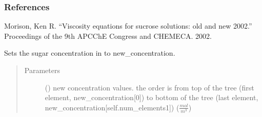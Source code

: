 \documentclass[letterpaper,10pt,english]{sphinxmanual}
\begin{document}
\begin{fulllineitems}
\begin{fulllineitems}
\begin{description}
\end{description}
\subsubsection*{References}

Morison, Ken R. “Viscosity equations for sucrose solutions: old and new 2002.”
Proceedings of the 9th APCChE Congress and CHEMECA. 2002.

\end{fulllineitems}


\begin{fulllineitems}
\label{\detokenize{index:src.tree.Tree.update_sugar_concentration}}
Sets the sugar concentration in  to new\_concentration.
\begin{quote}\begin{description}
\item[{Parameters}] \leavevmode
{} (\sphinxstyleliteralemphasis{\sphinxupquote{(}}\sphinxstyleliteralemphasis{\sphinxupquote{, }}\sphinxstyleliteralemphasis{\sphinxupquote{)}}\sphinxstyleliteralemphasis{\sphinxupquote{{[}}}\sphinxstyleliteralemphasis{\sphinxupquote{,}}\sphinxstyleliteralemphasis{\sphinxupquote{{]}}}) \textendash{} new concentration values.
the order is from top of the tree (first element, new\_concentration{[}0{]}) to bottom of the tree
(last element, new\_concentration{[}self.num\_elements\sphinxhyphen{}1{]}) (\(\frac{mol}{m^3}\))

\end{description}\end{quote}

\end{fulllineitems}


\end{fulllineitems}
\end{document}
